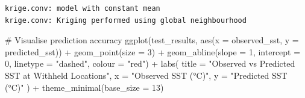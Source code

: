 \documentclass[
  11pt,
]{article}
\newenvironment{Shaded}{\begin{snugshade}}{\end{snugshade}}
\newcommand{\AttributeTok}[1]{\textcolor[rgb]{0.40,0.45,0.13}{#1}}
\newcommand{\CommentTok}[1]{\textcolor[rgb]{0.37,0.37,0.37}{#1}}
\newcommand{\DecValTok}[1]{\textcolor[rgb]{0.68,0.00,0.00}{#1}}
\newcommand{\FunctionTok}[1]{\textcolor[rgb]{0.28,0.35,0.67}{#1}}
\newcommand{\NormalTok}[1]{\textcolor[rgb]{0.00,0.23,0.31}{#1}}
\newcommand{\OtherTok}[1]{\textcolor[rgb]{0.00,0.23,0.31}{#1}}
\newcommand{\SpecialCharTok}[1]{\textcolor[rgb]{0.37,0.37,0.37}{#1}}
\newcommand{\StringTok}[1]{\textcolor[rgb]{0.13,0.47,0.30}{#1}}
\begin{document}
\begin{verbatim}
krige.conv: model with constant mean
krige.conv: Kriging performed using global neighbourhood 
\end{verbatim}

\begin{Shaded}
\end{Shaded}

\begin{Shaded}
\begin{Highlighting}[]
\CommentTok{\# Visualise prediction accuracy}
\FunctionTok{ggplot}\NormalTok{(test\_results, }\FunctionTok{aes}\NormalTok{(}\AttributeTok{x =}\NormalTok{ observed\_sst, }\AttributeTok{y =}\NormalTok{ predicted\_sst)) }\SpecialCharTok{+}
  \FunctionTok{geom\_point}\NormalTok{(}\AttributeTok{size =} \DecValTok{3}\NormalTok{) }\SpecialCharTok{+}
  \FunctionTok{geom\_abline}\NormalTok{(}\AttributeTok{slope =} \DecValTok{1}\NormalTok{, }\AttributeTok{intercept =} \DecValTok{0}\NormalTok{, }\AttributeTok{linetype =} \StringTok{"dashed"}\NormalTok{, }\AttributeTok{colour =} \StringTok{"red"}\NormalTok{) }\SpecialCharTok{+}
  \FunctionTok{labs}\NormalTok{(}
    \AttributeTok{title =} \StringTok{"Observed vs Predicted SST at Withheld Locations"}\NormalTok{,}
    \AttributeTok{x =} \StringTok{"Observed SST (°C)"}\NormalTok{,}
    \AttributeTok{y =} \StringTok{"Predicted SST (°C)"}
\NormalTok{  ) }\SpecialCharTok{+}
  \FunctionTok{theme\_minimal}\NormalTok{(}\AttributeTok{base\_size =} \DecValTok{13}\NormalTok{)}
\end{Highlighting}
\end{Shaded}
\end{document}
